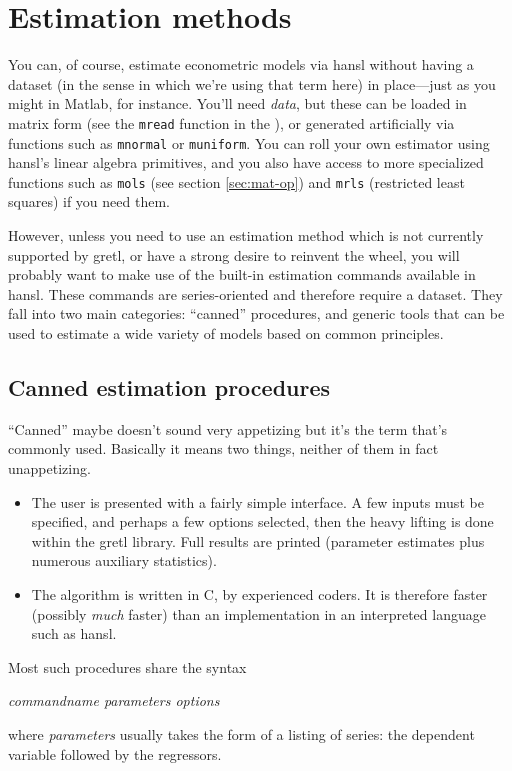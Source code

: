 \chapter{Estimation methods}
\label{chap:estimation}

You can, of course, estimate econometric models via hansl without
having a dataset (in the sense in which we're using that term here) in
place---just as you might in \textsf{Matlab}, for instance. You'll
need \textit{data}, but these can be loaded in matrix form (see the
\texttt{mread} function in the \GCR), or generated artificially via
functions such as \texttt{mnormal} or \texttt{muniform}. You can roll
your own estimator using hansl's linear algebra primitives, and you
also have access to more specialized functions such as \texttt{mols}
(see section \ref{sec:mat-op}) and \texttt{mrls} (restricted least
squares) if you need them.

However, unless you need to use an estimation method which is not
currently supported by gretl, or have a strong desire to reinvent the
wheel, you will probably want to make use of the built-in estimation
commands available in hansl. These commands are series-oriented and
therefore require a dataset. They fall into two main categories:
``canned'' procedures, and generic tools that can be used to estimate
a wide variety of models based on common principles.

\section{Canned estimation procedures}
\label{sec:canned}

``Canned'' maybe doesn't sound very appetizing but it's the term
that's commonly used. Basically it means two things, neither of them
in fact unappetizing.
\begin{itemize}
\item The user is presented with a fairly simple interface. A few
  inputs must be specified, and perhaps a few options selected, then
  the heavy lifting is done within the gretl library. Full results
  are printed (parameter estimates plus numerous auxiliary
  statistics). 
\item The algorithm is written in C, by experienced coders. It is
  therefore faster (possibly \textit{much} faster) than an
  implementation in an interpreted language such as hansl.
\end{itemize}

Most such procedures share the syntax
\begin{flushleft}
\quad \textsl{commandname parameters options}
\end{flushleft}
where \textsl{parameters} usually takes the form of a listing of
series: the dependent variable followed by the regressors.

